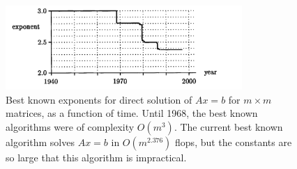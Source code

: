   \begin{figure}[H]
    \centering
    \includegraphics[width=0.8\textwidth]{figures/32-2.png}
    \caption{Best known exponents for direct solution of $ Ax=b $ for $ m\times m $ matrices, as a function of time. Until 1968, the best known algorithms were of complexity $ O(m^3) $. The current best known algorithm solves $ Ax=b $ in $ O(m^{2.376}) $ flops, but the constants are so large that this algorithm is impractical. }
  \end{figure}
